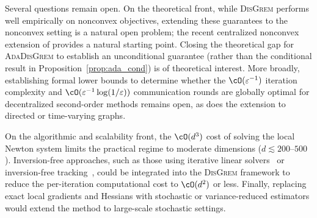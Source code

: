 \documentclass[review,onefignum,onetabnum]{siamart171218}
\begin{document}
	Several questions remain open.
	On the theoretical front, while \textsc{DisGrem} performs well empirically
	on nonconvex objectives, extending these guarantees to the nonconvex setting is a natural open problem;
	the recent centralized nonconvex extension of \citet{gratton2023nonconvex} provides
	a natural starting point. Closing the theoretical gap for
	\textsc{AdaDisGrem} to establish an unconditional guarantee (rather than the
	conditional result in Proposition~\ref{prop:ada_cond}) is of theoretical
	interest. More broadly, establishing formal lower bounds to determine whether
	the $\cO(\varepsilon^{-1})$ iteration complexity and
	$\cO(\varepsilon^{-1}\log(1/\varepsilon))$ communication rounds are globally
	optimal for decentralized second-order methods remains open, as does the
	extension to directed or time-varying graphs.

	On the algorithmic and scalability front, the $\cO(d^3)$ cost of solving the
	local Newton system limits the practical regime to moderate dimensions
	($d\lesssim 200$--$500$). Inversion-free approaches, such as those using
	iterative linear solvers~\citep{jakovetic2025dinas} or inversion-free tracking~\citep{yuan2023indo},
	could be integrated into the \textsc{DisGrem} framework to reduce
	the per-iteration computational cost to $\cO(d^2)$ or less. Finally, replacing
	exact local gradients and Hessians with stochastic or variance-reduced estimators
	would extend the method to large-scale stochastic settings.
	
\end{document}
